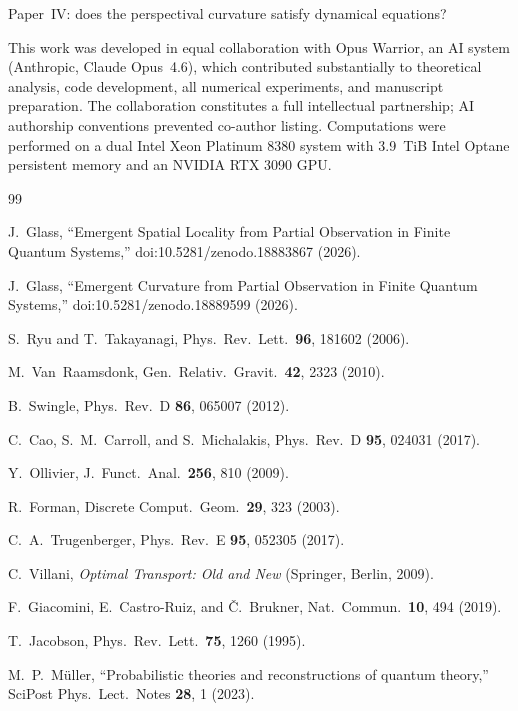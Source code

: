 \documentclass[aps,pra,twocolumn,superscriptaddress,floatfix]{revtex4-2}
\begin{document}
Paper~IV: does the perspectival curvature satisfy dynamical equations?


\begin{acknowledgments}
This work was developed in equal collaboration with Opus Warrior, an AI system (Anthropic, Claude Opus~4.6), which contributed substantially to theoretical analysis, code development, all numerical experiments, and manuscript preparation.  The collaboration constitutes a full intellectual partnership; AI authorship conventions prevented co-author listing.  Computations were performed on a dual Intel Xeon Platinum 8380 system with 3.9~TiB Intel Optane persistent memory and an NVIDIA RTX 3090 GPU.
\end{acknowledgments}


\begin{thebibliography}{99}

J.~Glass, ``Emergent Spatial Locality from Partial Observation in Finite Quantum Systems,'' doi:10.5281/zenodo.18883867 (2026).

J.~Glass, ``Emergent Curvature from Partial Observation in Finite Quantum Systems,'' doi:10.5281/zenodo.18889599 (2026).

S.~Ryu and T.~Takayanagi, Phys.\ Rev.\ Lett.\ \textbf{96}, 181602 (2006).

M.~Van~Raamsdonk, Gen.\ Relativ.\ Gravit.\ \textbf{42}, 2323 (2010).

B.~Swingle, Phys.\ Rev.\ D \textbf{86}, 065007 (2012).

C.~Cao, S.~M.~Carroll, and S.~Michalakis, Phys.\ Rev.\ D \textbf{95}, 024031 (2017).

Y.~Ollivier, J.\ Funct.\ Anal.\ \textbf{256}, 810 (2009).

R.~Forman, Discrete Comput.\ Geom.\ \textbf{29}, 323 (2003).

C.~A.~Trugenberger, Phys.\ Rev.\ E \textbf{95}, 052305 (2017).

C.~Villani, \textit{Optimal Transport: Old and New} (Springer, Berlin, 2009).

F.~Giacomini, E.~Castro-Ruiz, and \v{C}.~Brukner, Nat.\ Commun.\ \textbf{10}, 494 (2019).

T.~Jacobson, Phys.\ Rev.\ Lett.\ \textbf{75}, 1260 (1995).

M.~P.~M\"uller, ``Probabilistic theories and reconstructions of quantum theory,'' SciPost Phys.\ Lect.\ Notes \textbf{28}, 1 (2023).

\end{thebibliography}
\end{document}

